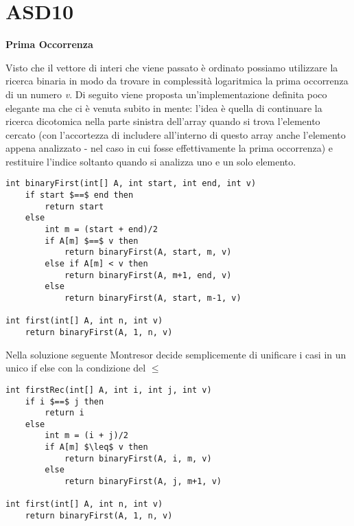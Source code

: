 \documentclass[../cheatSheetAlgoritmi.tex]{subfiles}
\begin{document}
\section{ASD10}
\textbf{Prima Occorrenza}

Visto che il vettore di interi che viene passato è ordinato possiamo utilizzare la ricerca binaria in modo da trovare in complessità logaritmica la prima occorrenza di un numero \textit{v}. Di seguito viene proposta un'implementazione definita poco elegante ma che ci è venuta subito in mente: l'idea è quella di continuare la ricerca dicotomica nella parte sinistra dell'array quando si trova l'elemento cercato (con l'accortezza di includere all'interno di questo array anche l'elemento appena analizzato - nel caso in cui fosse effettivamente la prima occorrenza) e restituire l'indice soltanto quando si analizza uno e un solo elemento.
 
\begin{lstlisting}[caption=Prima Occorrenza]
int binaryFirst(int[] A, int start, int end, int v)
	if start $==$ end then
		return start
  	else
    	int m = (start + end)/2
    	if A[m] $==$ v then
      		return binaryFirst(A, start, m, v)
    	else if A[m] < v then
        	return binaryFirst(A, m+1, end, v)
      	else
        	return binaryFirst(A, start, m-1, v)

int first(int[] A, int n, int v)
	return binaryFirst(A, 1, n, v)
\end{lstlisting}
Nella soluzione seguente Montresor decide semplicemente di unificare i casi in un unico if else con la condizione del $\leq$
\begin{lstlisting}[caption=Prima Occorrenza (by Montresor)]
int firstRec(int[] A, int i, int j, int v)
	if i $==$ j then
    	return i
  	else
    	int m = (i + j)/2
    	if A[m] $\leq$ v then
      		return binaryFirst(A, i, m, v)
    	else
      		return binaryFirst(A, j, m+1, v)
      
int first(int[] A, int n, int v)
	return binaryFirst(A, 1, n, v)
\end{lstlisting}
\end{document}
